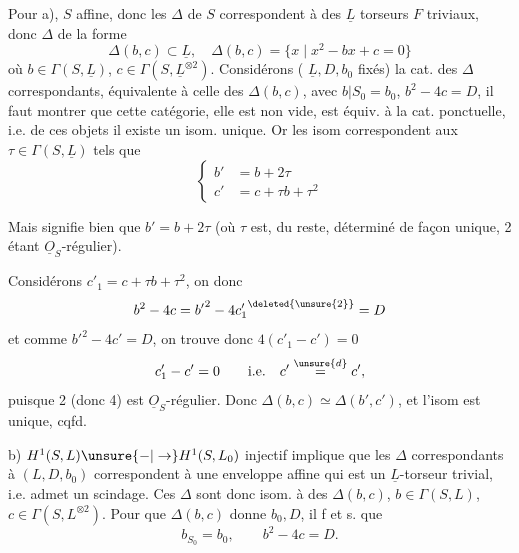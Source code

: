 Pour a),  $S$ affine, donc les  $\Delta$  de $S$ correspondent à des $\underline L$ torseurs $F$ triviaux, donc $\Delta$  de la forme
\[\Delta(b,c)\subset\underline L,\quad\Delta(b,c)=\{x\mid x^2-bx+c=0\}\]
où $b\in\Gamma(S,\underline L)$, $c\in\Gamma(S,\underline L^{\otimes2})$. Considérons ( $\underline L,D,b_0$ fixés) la cat. des $\Delta$ correspondants,  équivalente à celle des $\Delta(b,c)$, avec $b|S_0=b_0$, $b^2-4c=D$, il faut montrer que cette catégorie,   elle est non vide, est équiv. à la cat. ponctuelle, i.e.   de ces objets il existe un isom. unique. Or les  isom  correspondent aux $\tau\in\Gamma(S,\underline L)$ tels que
\[\left\{\begin{aligned} b'&=b+2\tau\\ c'&=c+\tau b+\tau^2\end{aligned}\right.\]

Mais   signifie bien que $b'=b+2\tau$ (où $\tau$ est, du reste, déterminé de façon unique, 2 étant $\underline O_S$-régulier).  

Considérons $c'_1=c+\tau b+\tau^{2}$, on  donc
\[b^2-4c={b'}^2-4{c'_1}^{\deleted{\unsure{2}}}=D\]
et comme $b'^{2}-4c'=D$, on trouve donc $4(c'_1-c')=0$
\[c'_1-c'=0\qquad\text{i.e.}\quad c'\overset{\unsure{d}}=c',\]
puisque 2  (donc 4) est $\underline O_S$-régulier. Donc $\Delta(b,c)\simeq\Delta(b',c')$, et l'isom est unique, cqfd.

b)  $H^1(S,L)\unsure{-|\to}H^1(S,L_0)$ injectif implique que les $\Delta$ correspondants à $(L,D,b_0)$ correspondent à une enveloppe affine qui est un $\underline L$-torseur trivial, i.e. admet un scindage. Ces $\Delta$ sont donc isom. à des $\Delta(b,c)$,  $b\in\Gamma(S,L)$, $c\in\Gamma(S,L^{\otimes2})$.  Pour que $\Delta(b,c)$ donne $b_0,D$, il f et s. que
\[b_{S_0}=b_0,\qquad b^2-4c=D.\]

